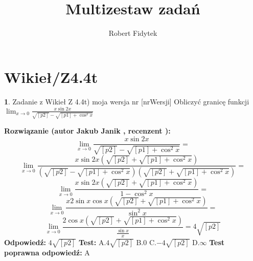 \documentclass[12pt, a4paper]{article}
\title{Multizestaw zadań}
\author{Robert Fidytek}
\date{}
\theoremstyle{definition} %
\newtheorem{zad}{}
\newcommand{\kategoria}[1]{\section{#1}} %
\newcommand{\zadStart}[1]{\begin{zad}#1\newline} %
\newcommand{\zadStop}{\end{zad}}   %
\newcommand{\rozwStart}[2]{\noindent \textbf{Rozwiązanie (autor #1 , recenzent #2): }\newline} %
\newcommand{\rozwStop}{\newline}                                            %
\newcommand{\odpStart}{\noindent \textbf{Odpowiedź:}\newline}    %
\newcommand{\odpStop}{\newline}                                             %
\newcommand{\testStart}{\noindent \textbf{Test:}\newline} %
\newcommand{\testStop}{\newline} %
\newcommand{\kluczStart}{\noindent \textbf{Test poprawna odpowiedź:}\newline} %
\newcommand{\kluczStop}{\newline} %
\begin{document}
\maketitle


\kategoria{Wikieł/Z4.4t}
\zadStart{Zadanie z Wikieł Z 4.4t) moja wersja nr [nrWersji]}
Obliczyć granicę funkcji $\lim_{x \to 0} \frac{x\sin{2x}}{\sqrt{[p2]}-\sqrt{[p1]+\cos^2{x}}}$
\zadStop
\rozwStart{Jakub Janik}{}
$$\lim_{x \to 0} \frac{x\sin{2x}}{\sqrt{[p2]}-\sqrt{[p1]+\cos^2{x}}}=$$
$$\lim_{x \to 0} \frac{x\sin{2x}(\sqrt{[p2]}+\sqrt{[p1]+\cos^2{x}})}{(\sqrt{[p2]}-\sqrt{[p1]+\cos^2{x}})(\sqrt{[p2]}+\sqrt{[p1]+\cos^2{x}})}=$$
$$\lim_{x \to 0} \frac{x\sin{2x}(\sqrt{[p2]}+\sqrt{[p1]+\cos^2{x}})}{1-\cos^2{x}}=$$
$$\lim_{x \to 0} \frac{x2\sin{x}\cos{x}(\sqrt{[p2]}+\sqrt{[p1]+\cos^2{x}})}{\sin^2{x}}=$$
$$\lim_{x \to 0} \frac{2\cos{x}(\sqrt{[p2]}+\sqrt{[p1]+\cos^2{x}})}{\frac{\sin{x}}{x}}=4\sqrt{[p2]}$$
\rozwStop
\odpStart
$4\sqrt{[p2]}$
\odpStop
\testStart
A.$4\sqrt{[p2]}$
B.$0$
C.$-4\sqrt{[p2]}$
D.$\infty$
\testStop
\kluczStart
A
\kluczStop
\end{document}
